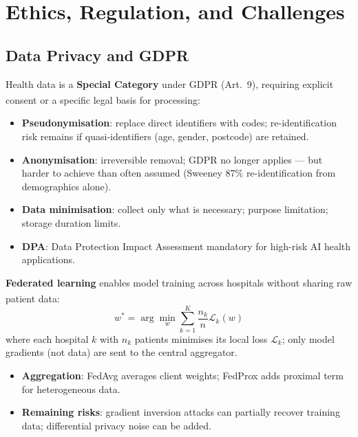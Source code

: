 \section{Ethics, Regulation, and Challenges}

\subsection{Data Privacy and GDPR}

\begin{tcbitemize}[ skin=sectionraster ]
    \tcbitem[title={Health Data Sensitivity and GDPR}, raster multicolumn=3]
    Health data is a \textbf{Special Category} under GDPR (Art.~9), requiring explicit consent or a specific legal basis for processing\textsuperscript{\cite[][pp.~89--110]{itgovernanceprivacyteamEUGDPR2020}}:
    \begin{itemize}
        \item \textbf{Pseudonymisation}: replace direct identifiers with codes; re-identification risk remains if quasi-identifiers (age, gender, postcode) are retained.
        \item \textbf{Anonymisation}: irreversible removal; GDPR no longer applies — but harder to achieve than often assumed (Sweeney 87\% re-identification from demographics alone).
        \item \textbf{Data minimisation}: collect only what is necessary; purpose limitation; storage duration limits.
        \item \textbf{DPA}: Data Protection Impact Assessment mandatory for high-risk AI health applications.
    \end{itemize}

    \tcbitem[title={Federated Learning for Healthcare}, raster multicolumn=3]
    \textbf{Federated learning} enables model training across hospitals without sharing raw patient data\textsuperscript{\cite[][p.~51]{liTwoDecadesFederated2020}}:
    \begin{equation}
        w^* = \arg\min_w \sum_{k=1}^{K} \frac{n_k}{n} \mathcal{L}_k(w)
    \end{equation}
    where each hospital $k$ with $n_k$ patients minimises its local loss $\mathcal{L}_k$; only model gradients (not data) are sent to the central aggregator.
    \begin{itemize}
        \item \textbf{Aggregation}: FedAvg averages client weights; FedProx adds proximal term for heterogeneous data.
        \item \textbf{Remaining risks}: gradient inversion attacks can partially recover training data; differential privacy noise can be added.
    \end{itemize}


\end{tcbitemize}

